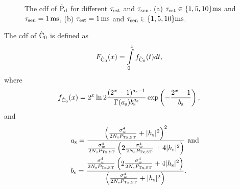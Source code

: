 \begin{figure}[!ht]
{
\quad
\label{fig_IS:CDF_pd_tsen}}
\vspace{0.3cm}
\caption{The cdf of $\epd$ for different $\test$ and $\tsen$. (a) $\test \in \{1,5,10\} \SI{}{ms}$ and $\tsen = \SI{1}{ms}$, (b) $\test = \SI{1}{ms}$ and $\tsen \in \{1,5,10\} \SI{}{ms}$.}
\label{fig_IS:CDF_pd}
\end{figure}


\begin{lemma} \label{lm_IS:lem2}
\normalfont
The cdf of $\ecz$ is defined as
\begin{align}
\fcz(x) &= \int\limits_{0}^{x} \dcz(t) dt, \label{eq_IS:dis_C0} 
\end{align}
where
\begin{align}
\dcz(x) &= 2^x \ln 2 \frac{(2^x - 1)^{\as - 1}}{\Gamma(\as) \bs^{\as}} \exp\left(-\frac{2^x - 1}{\bs}\right),  \label{eq_IS:den_C0}
\end{align}
and  
\begin{align}
\quad & \as = \frac{\left(\lambdas + |\hs|^2  \right)^2 }{ \lambdas \left(2 \lambdas + 4 |\hs|^2  \right)}   \text{  and  } \nonumber \\ \quad & \bs = \frac{\lambdas \left(2 \lambdas + 4  |\hs|^2 \right)}{\left( \lambdas + |\hs|^2  \right) } \label{eq_IS:para_s}. 
\end{align}
\end{lemma} 
\begin{IEEEproof}
\end{IEEEproof}

